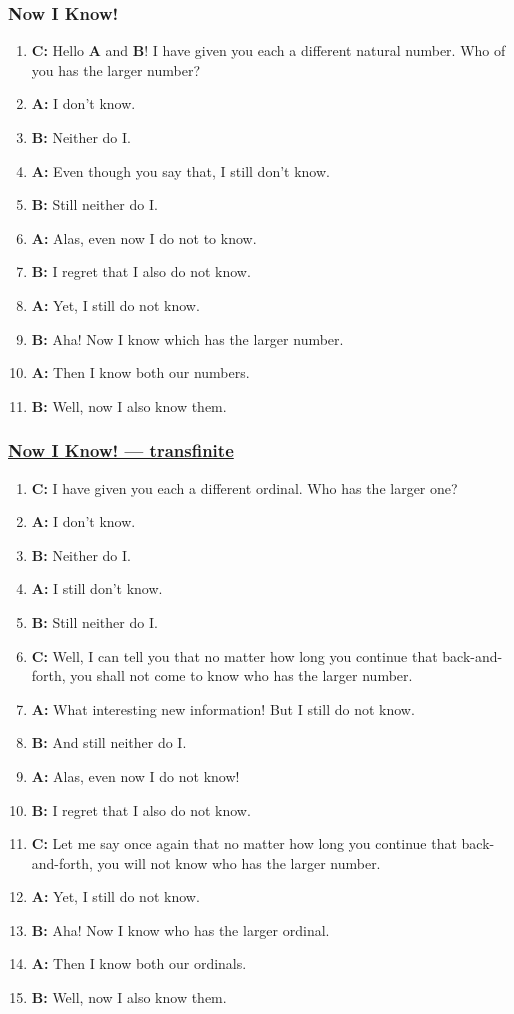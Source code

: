 \documentclass[UTF8,aspectratio=43,11pt,colorlinks,compress,openany]{beamer}%
\begin{document}
\begin{frame}\frametitle{Now I Know!}
	\begin{enumerate}
		\item \textbf{C:} Hello \textbf{A} and \textbf{B}! I have given you each a different natural number. Who of you has the larger number?
		\item \textbf{A:} I don't know.
		\item \textbf{B:} Neither do I.
		\item \textbf{A:} Even though you say that, I still don't know.
		\item \textbf{B:} Still neither do I.
		\item \textbf{A:} Alas, even now I do not to know.
		\item \textbf{B:} I regret that I also do not know.
		\item \textbf{A:} Yet, I still do not know.
		\item \textbf{B:} Aha! Now I know which has the larger number.
		\item \textbf{A:} Then I know both our numbers.
		\item \textbf{B:} Well, now I also know them.
	\end{enumerate}
\end{frame}

\begin{frame}\frametitle{\href{http://www.matrix67.com/blog/archives/6377?from=timeline}{Now I Know! --- transfinite}}
\vspace*{-6pt}
	\begin{enumerate}
		\item \textbf{C:} I have given you each a different ordinal. Who has the larger one?
		\item \textbf{A:} I don't know.
		\item \textbf{B:} Neither do I.
		\item \textbf{A:} I still don't know.
		\item \textbf{B:} Still neither do I.
		\item \textbf{C:} Well, I can tell you that no matter how long you continue that back-and-forth, you shall not come to know who has the larger number.
		\item \textbf{A:} What interesting new information! But I still do not know.
		\item \textbf{B:} And still neither do I.
		\item \textbf{A:} Alas, even now I do not know!
		\item \textbf{B:} I regret that I also do not know.
		\item \textbf{C:} Let me say once again that no matter how long you continue that back-and-forth, you will not know who has the larger number.
		\item \textbf{A:} Yet, I still do not know.
		\item \textbf{B:} Aha! Now I know who has the larger ordinal.
		\item \textbf{A:} Then I know both our ordinals.
		\item \textbf{B:} Well, now I also know them.
	\end{enumerate}
\end{frame}
\end{document}
